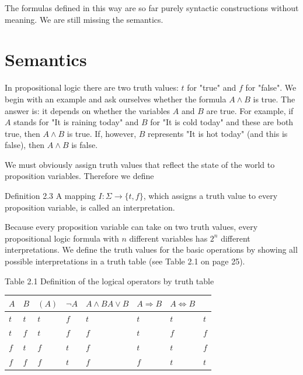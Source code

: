 \documentclass[10pt]{book}
\begin{document}
The formulas defined in this way are so far purely syntactic constructions without meaning. We are still missing the semantics.

\section{Semantics}
In propositional logic there are two truth values: $t$ for "true" and $f$ for "false". We begin with an example and ask ourselves whether the formula $A \wedge B$ is true. The answer is: it depends on whether the variables $A$ and $B$ are true. For example, if $A$ stands for "It is raining today" and $B$ for "It is cold today" and these are both true, then $A \wedge B$ is true. If, however, $B$ represents "It is hot today" (and this is false), then $A \wedge B$ is false.

We must obviously assign truth values that reflect the state of the world to proposition variables. Therefore we define

\begin{displayquote}
Definition 2.3 A mapping $I: \Sigma \rightarrow\{t, f\}$, which assigns a truth value to every proposition variable, is called an interpretation.
\end{displayquote}

Because every proposition variable can take on two truth values, every propositional logic formula with $n$ different variables has $2^{n}$ different interpretations. We define the truth values for the basic operations by showing all possible interpretations in a truth table (see Table 2.1 on page 25).

Table 2.1 Definition of the logical operators by truth table


\begin{center}
\begin{tabular}{llllllll}
\hline
$A$ & $B$ & $(A)$ & $\neg A$ & $A \wedge B A \vee B$ & $A \Rightarrow B$ & $A \Leftrightarrow B$ &  \\
\hline
$t$ & $t$ & $t$ & $f$ & $t$ & $t$ & $t$ & $t$ \\
\hline
$t$ & $f$ & $t$ & $f$ & $f$ & $t$ & $f$ & $f$ \\
\hline
$f$ & $t$ & $f$ & $t$ & $f$ & $t$ & $t$ & $f$ \\
\hline
$f$ & $f$ & $f$ & $t$ & $f$ & $f$ & $t$ & $t$ \\
\hline
\end{tabular}
\end{center}
\end{document}
